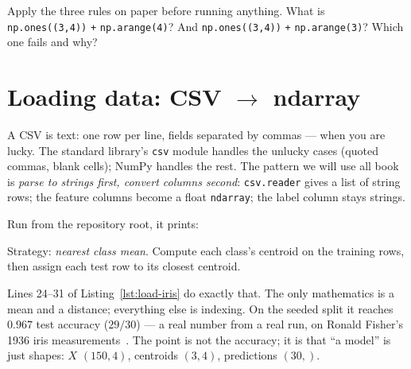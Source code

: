 \begin{checkpoint}
Apply the three rules on paper before running anything. What is
\texttt{np.ones((3,4))} \texttt{+} \texttt{np.arange(4)}? And
\texttt{np.ones((3,4))} \texttt{+} \texttt{np.arange(3)}? Which one fails
and why?
\end{checkpoint}

\section{Loading data: CSV \texorpdfstring{$\to$}{->} ndarray}\label{sec:loading}

A CSV is text: one row per line, fields separated by commas --- when you are
lucky. The standard library's \texttt{csv} module handles the unlucky cases
(quoted commas, blank cells); NumPy handles the rest. The pattern we will use
all book is \emph{parse to strings first, convert columns second}:
\texttt{csv.reader} gives a list of string rows; the feature columns become a
float \texttt{ndarray}; the label column stays strings.



Run from the repository root, it prints:



\begin{example}\label{ex:eight-lines}
Strategy: \emph{nearest class mean}. Compute each class's centroid on the
training rows, then assign each test row to its closest centroid.\par
\begin{solution}
Lines 24--31 of Listing~\ref{lst:load-iris} do exactly that. The only
mathematics is a mean and a distance; everything else is indexing. On the
seeded split it reaches $0.967$ test accuracy ($29/30$) --- a real number from
a real run, on Ronald Fisher's 1936 iris measurements~\cite{fisher1936}. The
point is not the accuracy; it is that ``a model'' is just shapes: $X$
$(150,4)$, centroids $(3,4)$, predictions $(30,)$.
\end{solution}
\end{example}

